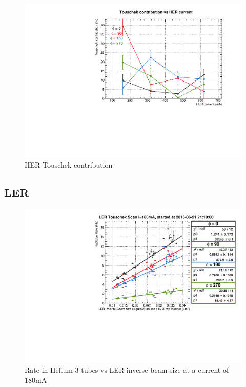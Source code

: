 \begin{figure}[htb]
	\centerfloat
		\includegraphics[scale=0.6]{images/HER_beamSize}
	\caption{HER Touschek contribution}	
	\label{fig:TousHERContrib}
\end{figure}

\clearpage

\subsection{LER}

\begin{figure}[htb]
	\centerfloat
		\includegraphics[trim={0 0 0 0.75cm},clip, scale=0.6]{images/12009}
	\caption{Rate in Helium-3 tubes vs LER inverse beam size at a current of 180mA}	
	\label{fig:TousLER12009}
\end{figure}

